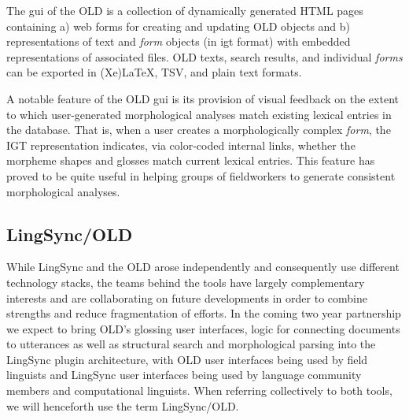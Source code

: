 \documentclass[11pt]{article}
\begin{document}
The \gls{gui} of the OLD is a collection of dynamically generated HTML pages
containing a) web forms for creating and updating OLD objects and b)
representations of text and \emph{form} objects (in \gls{igt} format) with
embedded representations of associated files. OLD texts, search results, and
individual \emph{forms} can be exported in (Xe)LaTeX, TSV, and plain text
formats.

A notable feature of the OLD \gls{gui} is its provision of visual feedback on the
extent to which user-generated morphological analyses match existing lexical
entries in the database. That is, when a user creates a morphologically complex
\emph{form}, the IGT representation indicates, via color-coded internal links,
whether the morpheme shapes and glosses match current lexical entries. This
feature has proved to be quite useful in helping groups of fieldworkers to
generate consistent morphological analyses.



\subsection{LingSync/OLD}

While LingSync and the OLD arose independently and consequently use different
technology stacks, the teams behind the tools have largely complementary interests and are collaborating on
future developments in order to combine strengths and reduce fragmentation of
efforts. In the coming two year partnership we expect to bring OLD's glossing user interfaces, 
logic for connecting documents to utterances as well as structural search and morphological 
parsing into the LingSync plugin architecture, with OLD user interfaces being used by field 
linguists and LingSync user interfaces being used by language community members and 
computational linguists. When referring collectively to both tools, we will henceforth use the
term LingSync/OLD.
\end{document}
